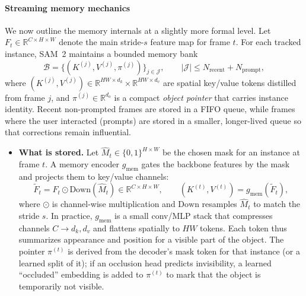 \begin{enrichment}
\begin{enrichment}
		\paragraph{Streaming memory mechanics}
		We now outline the memory internals at a slightly more formal level. Let \(F_t \in \mathbb{R}^{C \times H \times W}\) denote the main stride-\(s\) feature map for frame \(t\). For each tracked instance, SAM~2 maintains a bounded memory bank
		\[
		\mathcal{B} = \Big\{(K^{(j)}, V^{(j)}, \pi^{(j)})\Big\}_{j \in \mathcal{J}}, \qquad |\mathcal{J}| \leq N_{\text{recent}} + N_{\text{prompt}},
		\]
		where \((K^{(j)},V^{(j)}) \in \mathbb{R}^{HW \times d_k} \times \mathbb{R}^{HW \times d_v}\) are spatial key/value tokens distilled from frame \(j\), and \(\pi^{(j)} \in \mathbb{R}^{d_o}\) is a compact \emph{object pointer} that carries instance identity. Recent non-prompted frames are stored in a FIFO queue, while frames where the user interacted (prompts) are stored in a smaller, longer-lived queue so that corrections remain influential.
		
		\begin{itemize}
			\item \textbf{What is stored.} Let \(\hat{M}_t \in \{0,1\}^{H \times W}\) be the chosen mask for an instance at frame \(t\). A memory encoder \(g_{\text{mem}}\) gates the backbone features by the mask and projects them to key/value channels:
			\[
			\tilde{F}_t = F_t \odot \text{Down}(\hat{M}_t) \in \mathbb{R}^{C \times H \times W}, \qquad
			(K^{(t)}, V^{(t)}) = g_{\text{mem}}(\tilde{F}_t),
			\]
			where \(\odot\) is channel-wise multiplication and \(\text{Down}\) resamples \(\hat{M}_t\) to match the stride \(s\). In practice, \(g_{\text{mem}}\) is a small conv/MLP stack that compresses channels \(C \to d_k,d_v\) and flattens spatially to \(HW\) tokens. Each token thus summarizes appearance and position for a visible part of the object. The pointer \(\pi^{(t)}\) is derived from the decoder’s mask token for that instance (or a learned split of it); if an occlusion head predicts invisibility, a learned ``occluded'' embedding is added to \(\pi^{(t)}\) to mark that the object is temporarily not visible.
			

\end{itemize}
\end{enrichment}
\end{enrichment}

